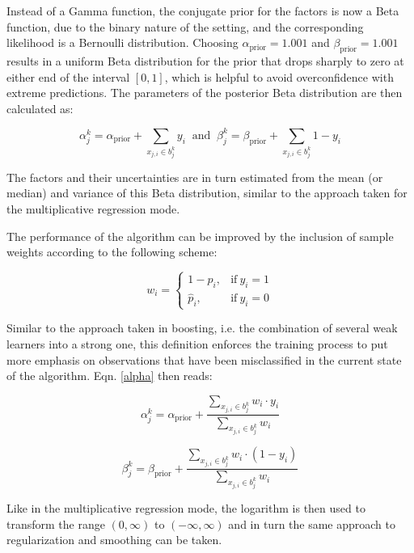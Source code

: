 \documentclass[BCOR=1mm, DIV=calc,10pt,
twoside=true,
twocolumn,
headings=normal]{scrartcl}
\begin{document}
Instead of a Gamma function, the conjugate prior for the factors is now a Beta function,
due to the binary nature of the setting, and the corresponding likelihood is a Bernoulli
distribution. Choosing  $\alpha_{\text{prior}} = 1.001$ and $\beta_{\text{prior}} = 1.001$
results in a uniform Beta distribution for the prior that drops sharply to zero at either
end of the interval $[0,1]$, which is helpful to avoid overconfidence with extreme
predictions. The parameters of the posterior Beta distribution are then calculated as:

\begin{equation} \label{alpha}
\alpha^k_j = \alpha_{\text{prior}} + \sum \limits_{x_{j,i} \in b^k_j} y_i  \;\; \mathrm{and} \;\;
\beta^k_j = \beta_{\text{prior}} + \sum \limits_{x_{j,i} \in b^k_j} 1 - y_i
\end{equation}

The factors and their uncertainties are in turn estimated from the mean (or median) and
variance of this Beta distribution, similar to the approach taken for the multiplicative
regression mode.

The performance of the algorithm can be improved by the inclusion of sample weights
according  to the following scheme:

\begin{equation}
w_i = 
\begin{cases}
1 - \hat{p}_i, & \text{if}\ y_i = 1 \\
\hat{p}_i, & \text{if}\ y_i = 0
\end{cases}
\end{equation}

Similar to the approach taken in boosting, i.e. the combination of several weak learners
into a strong one, this definition enforces the training process to put more emphasis on
observations that have been misclassified in the current state of the algorithm. Eqn.
\ref{alpha} then reads:

\begin{equation}
\alpha^k_j = \alpha_{\text{prior}} + \frac{\sum \limits_{x_{j,i} \in b^k_j} w_i \cdot y_i}{\sum \limits_{x_{j,i} \in b^k_j} w_i}
\end{equation}

\begin{equation}
\beta^k_j = \beta_{\text{prior}} + \frac{\sum \limits_{x_{j,i} \in b^k_j} w_i \cdot (1 - y_i)}{\sum \limits_{x_{j,i} \in b^k_j} w_i}
\end{equation}

Like in the multiplicative regression mode, the logarithm is then used to transform the
range $(0, \infty)$ to $(-\infty, \infty)$ and in turn the same approach to regularization
and smoothing can be taken.
\end{document}

